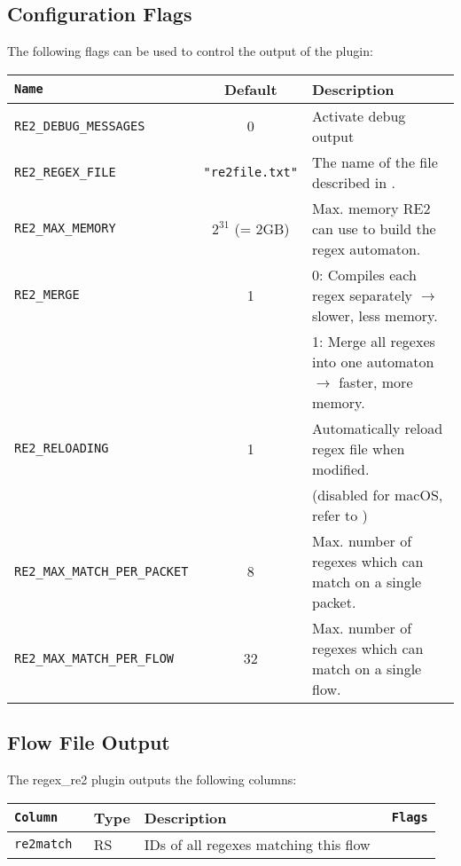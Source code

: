 \documentclass[documentation]{subfiles}
\begin{document}
\subsection{Configuration Flags}
The following flags can be used to control the output of the plugin:
\begin{longtable}{>{\tt}lcl}
    \toprule
    {\bf Name} & {\bf Default} & {\bf Description}\\
    \midrule\endhead%
    RE2\_DEBUG\_MESSAGES         & 0                         & Activate debug output\\
    RE2\_REGEX\_FILE             & {\tt\small "re2file.txt"} & The name of the file described in {re2RequiredFiles}.\\
    RE2\_MAX\_MEMORY             & $2^{31}$ (= 2GB)          & Max. memory RE2 can use to build the regex automaton.\\
    RE2\_MERGE                   & 1                         & 0: Compiles each regex separately $\rightarrow$ slower, less memory.\\
                                 &                           & 1: Merge all regexes into one automaton $\rightarrow$ faster, more memory.\\
    RE2\_RELOADING               & 1                         & Automatically reload regex file when modified.\\
                                 &                           & (disabled for macOS, refer to {s:re2-bugs})\\
    RE2\_MAX\_MATCH\_PER\_PACKET & 8                         & Max. number of regexes which can match on a single packet.\\
    RE2\_MAX\_MATCH\_PER\_FLOW   & 32                        & Max. number of regexes which can match on a single flow.\\
    \bottomrule
\end{longtable}

\subsection{Flow File Output}
\label{re2FlowOutput}
The regex\_re2 plugin outputs the following columns:
\begin{longtable}{>{\tt}lll>{\tt}l}
    \toprule
    {\bf Column} & {\bf Type} & {\bf Description} & {\bf Flags}\\
    \midrule\endhead%
    re2match & RS & IDs of all regexes matching this flow & \\
    \bottomrule
\end{longtable}
\end{document}
